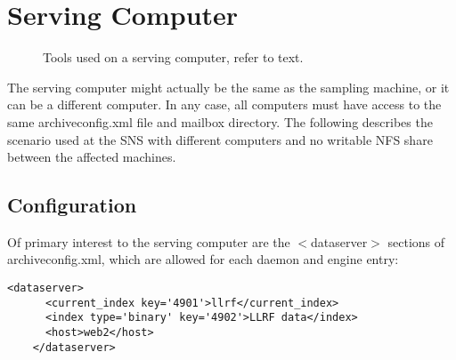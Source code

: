 \section{Serving Computer}
\begin{figure}[htb]
\begin{center}
\end{center}
\caption{\label{fig:acServe}Tools used on a serving computer, refer to text.}
\end{figure}

\noindent The serving computer might actually be the same as the
sampling machine, or it can be a different computer. In any case, all
computers must have access to the same archiveconfig.xml file and
mailbox directory.
The following describes the scenario used at the SNS with 
different computers and no writable NFS share between the
affected machines.

\subsection{Configuration}
Of primary interest to the serving computer are the $<$dataserver$>$
sections of archiveconfig.xml, which are allowed for each daemon and
engine entry:

\begin{lstlisting}[frame=none,keywordstyle=\sffamily]
   <dataserver>
      <current_index key='4901'>llrf</current_index>
      <index type='binary' key='4902'>LLRF data</index>
      <host>web2</host>
    </dataserver>
\end{lstlisting}

